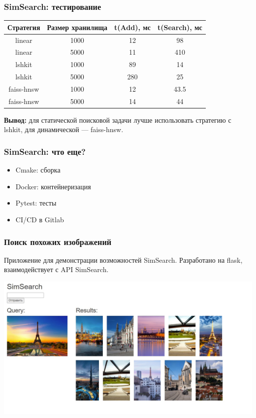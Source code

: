 \documentclass{beamer}
\begin{document}
\begin{frame}
\frametitle{SimSearch: тестирование}

\centering
\begin{tabular}{|c|c|c|c|}
\hline
    Стратегия & Размер хранилища &  t(Add), мс & t(Search), мс \\
     \hline
    linear & 1000 & 12 & 98 \\
    \hline 
    linear & 5000 & 11 & 410 \\
    \hline 
    lshkit & 1000 & 89 & 14 \\
    \hline 
    lshkit & 5000 & 280 & 25 \\
    \hline 
    faiss-hnsw & 1000 & 12 & 43.5 \\
    \hline 
    faiss-hnsw & 5000 & 14 & 44 \\
    \hline 
\end{tabular}

\hfill

\textbf{Вывод:} для статической поисковой задачи лучше использовать стратегию с lshkit, для динамической --- faiss-hnsw.

\end{frame}

\begin{frame}
\frametitle{SimSearch: что еще?}

\begin{itemize}
\item Cmake: сборка
\item Docker: контейнеризация
\item Pytest: тесты
\item CI/CD в Gitlab  
\end{itemize}

\end{frame}

\begin{frame}
\frametitle{Поиск похожих изображений}

Приложение для демонстрации возможностей SimSearch. Разработано на flask, взаимодействует с API SimSearch.

\begin{center}
\includegraphics[width=\linewidth]{simsearch_paris.jpg}

\end{center}


\end{frame}
\end{document}
